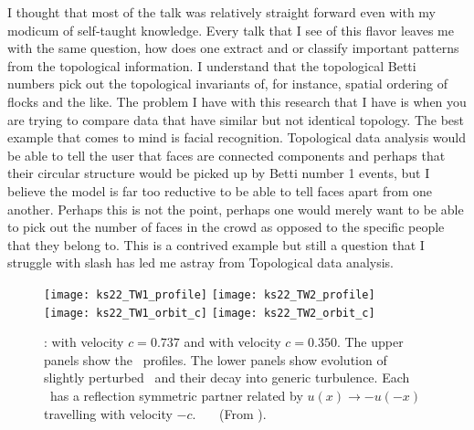 \begin{description}
{\begin{description}
I thought that most of the talk was relatively straight forward even
with my modicum of self-taught knowledge. Every talk that I see of this
flavor leaves me with the same question, how does one extract and or classify
important patterns from the topological information. I understand that
the topological Betti numbers pick out the topological invariants
of, for instance, spatial ordering of flocks and the like. The
problem I have with this research that I have is when you are trying
to compare data that have similar but not identical topology. The
best example that comes to mind is facial recognition. Topological
data analysis would be able to tell the user that faces are connected
components and perhaps that their circular structure  would be picked up by
Betti number 1 events, but I believe the model is far too reductive
to be able to tell faces apart from one another. Perhaps this is not
the point, perhaps one would merely want to be able to pick out the number of
faces in the crowd as opposed to the specific people that they belong to.
This is a contrived example but still a question that I struggle with slash
has led me astray from Topological data analysis.
\end{description}
}

\begin{figure}[t]
\begin{center}
\texttt{[image: ks22\_TW1\_profile]}
\texttt{[image: ks22\_TW2\_profile]}\\
\texttt{[image: ks22\_TW1\_orbit\_c]}
\texttt{[image: ks22\_TW2\_orbit\_c]}
\end{center}
\caption{
\Reqva :  with velocity $c = 0.737$ and  with
velocity $c = 0.350$.
The upper panels show the \reqva\ profiles.  The lower panels show
evolution of slightly perturbed \reqva\ and their decay into generic
turbulence. Each \reqv\ has a reflection symmetric partner related by
$u(x) \to -u(-x)$ travelling with velocity $-c$.
~~~(From ).
} \label{f:ks22TW}
\end{figure}



\end{description}
